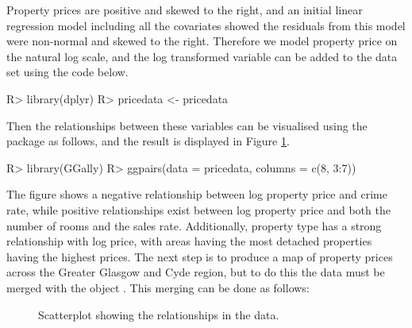 \documentclass[article,shortnames,nojss]{jss}
\begin{document}
\hspace{1cm}Property prices are positive and skewed to the right, and an initial linear regression model including all the covariates showed the residuals from this model were non-normal and skewed to the right. Therefore we model property price on the natural log scale, and the log transformed variable can be added to the data set using the code below.

\begin{Schunk}
\begin{Sinput}
R> library(dplyr)
R> pricedata <- pricedata %
\end{Sinput}
\end{Schunk}

Then the relationships between these variables can be visualised using the  package as follows, and the result is displayed in Figure \ref{scatterplot}.


\begin{Schunk}
\begin{Sinput}
R> library(GGally)
R> ggpairs(data = pricedata, columns = c(8, 3:7))
\end{Sinput}
\end{Schunk}

The figure shows a negative relationship between log property price and crime rate, while positive relationships exist between log property price and both the number of rooms and the sales rate. Additionally, property type has a strong relationship with log price, with areas having the most detached properties having the highest prices. The next step is to produce a map of property prices across the Greater Glasgow and Cyde region, but to do this the data must be merged with the  object . This merging can be done as follows:


\begin{figure}
\centering 
{}
\caption{Scatterplot showing the relationships in the data.\label{scatterplot}}
\end{figure} 
\end{document}
